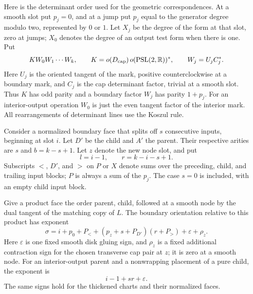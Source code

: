 Here is the determinant order used for the geometric correspondences.
At a smooth slot put $p_j=0$, and at a jump put $p_j$ equal to the
generator degree modulo two, represented by $0$ or $1$.  Let $X_j$ be
the degree of the form at that slot, zero at jumps; $X_0$ denotes the
degree of an output test form when there is one.  Put
\begin{equation}
 \label{obs:determinant-order}
 K W_0W_1\cdots W_k,\qquad
 K=o(D_{\mathrm{cap}})\,o(\mathrm{PSL}(2,\mathbb R))^*,\qquad
 W_j=U_jC_j^*.
\end{equation}
Here $U_j$ is the oriented tangent of the mark, positive
counterclockwise at a boundary mark, and $C_j$ is the cap determinant
factor, trivial at a smooth slot.  Thus $K$ has odd parity and a
boundary factor $W_j$ has parity $1+p_j$.  For an interior-output
operation $W_0$ is just the even tangent factor of the interior mark.
All rearrangements of determinant lines use the Koszul rule.

Consider a normalized boundary face that splits off $s$ consecutive
inputs, beginning at slot $i$.  Let $D'$ be the child and $A'$ the
parent.  Their respective arities are $s$ and
$b=k-s+1$.  Let $z$ denote the new node slot, and put
\[
 l=i-1,\qquad r=k-i-s+1.
\]
Subscripts $<$, $D'$, and $>$ on $P$ or $X$ denote sums over the
preceding, child, and trailing input blocks; $P$ is always a sum of
the $p_j$.  The case $s=0$ is included, with an empty child input block.

\begin{lemma}\label{obs:boundary-sign}
Give a product face the order parent, child, followed at a smooth node
by the dual tangent of the matching copy of $L$.  The boundary
orientation relative to this product has exponent
\begin{equation}
 \label{obs:boundary-exponent}
 \sigma=i+p_0+P_<+
       (p_z+s+P_{D'})(r+P_>)+\varepsilon+\rho_z.
\end{equation}
Here $\varepsilon$ is one fixed smooth disk gluing sign, and $\rho_z$
is a fixed additional contraction sign for the chosen transverse cap
pair at $z$; it is zero at a smooth node.  For an interior-output
parent and a nonwrapping placement of a pure child, the exponent is
\begin{equation}
 \label{obs:p-boundary-exponent}
 i-1+sr+\varepsilon.
\end{equation}
The same signs hold for the thickened charts and their normalized
faces.
\end{lemma}

